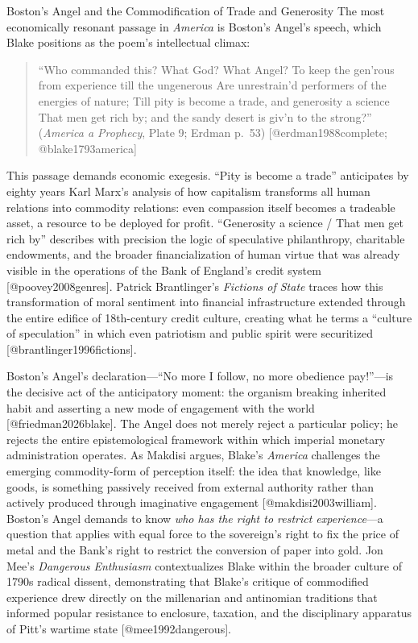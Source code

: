 \documentclass[
  ignorenonframetext,
]{beamer}
\begin{document}
\begin{frame}{Boston's Angel and the Commodification of Trade and
Generosity}
\protect{}\label{bostons-angel-and-the-commodification-of-trade-and-generosity}
The most economically resonant passage in \emph{America} is Boston's
Angel's speech, which Blake positions as the poem's intellectual climax:

\begin{quote}
``Who commanded this? What God? What Angel? To keep the gen'rous from
experience till the ungenerous Are unrestrain'd performers of the
energies of nature; Till pity is become a trade, and generosity a
science That men get rich by; and the sandy desert is giv'n to the
strong?'' (\emph{America a Prophecy}, Plate 9; Erdman p.~53)
{[}@erdman1988complete; @blake1793america{]}
\end{quote}

This passage demands economic exegesis. ``Pity is become a trade''
anticipates by eighty years Karl Marx's analysis of how capitalism
transforms all human relations into commodity relations: even compassion
itself becomes a tradeable asset, a resource to be deployed for profit.
``Generosity a science / That men get rich by'' describes with precision
the logic of speculative philanthropy, charitable endowments, and the
broader financialization of human virtue that was already visible in the
operations of the Bank of England's credit system
{[}@poovey2008genres{]}. Patrick Brantlinger's \emph{Fictions of State}
traces how this transformation of moral sentiment into financial
infrastructure extended through the entire edifice of 18th-century
credit culture, creating what he terms a ``culture of speculation'' in
which even patriotism and public spirit were securitized
{[}@brantlinger1996fictions{]}.

Boston's Angel's declaration---``No more I follow, no more obedience
pay!''---is the decisive act of the anticipatory moment: the organism
breaking inherited habit and asserting a new mode of engagement with the
world {[}@friedman2026blake{]}. The Angel does not merely reject a
particular policy; he rejects the entire epistemological framework
within which imperial monetary administration operates. As Makdisi
argues, Blake's \emph{America} challenges the emerging commodity-form of
perception itself: the idea that knowledge, like goods, is something
passively received from external authority rather than actively produced
through imaginative engagement {[}@makdisi2003william{]}. Boston's Angel
demands to know \emph{who has the right to restrict experience}---a
question that applies with equal force to the sovereign's right to fix
the price of metal and the Bank's right to restrict the conversion of
paper into gold. Jon Mee's \emph{Dangerous Enthusiasm} contextualizes
Blake within the broader culture of 1790s radical dissent, demonstrating
that Blake's critique of commodified experience drew directly on the
millenarian and antinomian traditions that informed popular resistance
to enclosure, taxation, and the disciplinary apparatus of Pitt's wartime
state {[}@mee1992dangerous{]}.
\end{frame}
\end{document}
